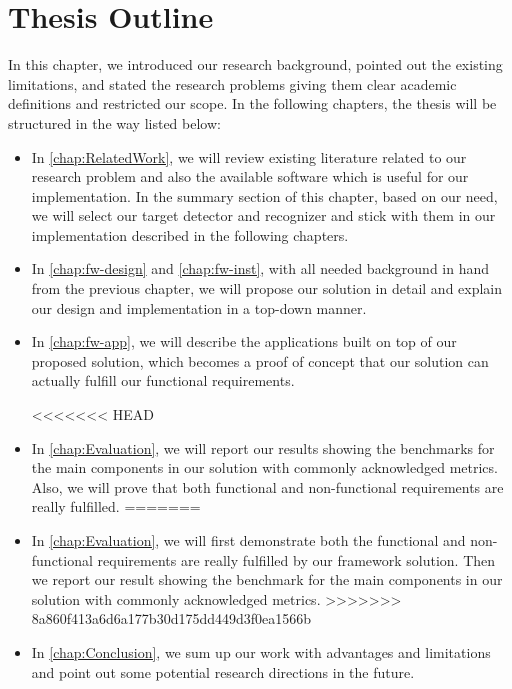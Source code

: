 
\section{Thesis Outline}
\label{sec:intro-outline}

In this chapter, we introduced our research background, pointed out the
existing limitations, and stated the research problems giving them clear academic
definitions and restricted our scope.
In the following chapters, the thesis will be structured in the way listed
below:

\begin{itemize}
    \item In \autoref{chap:RelatedWork}, we will review existing literature
    related to our research problem and also the available software which is
    useful for our implementation. In the summary section of this chapter,
    based on our need, we will select our target detector and recognizer and
    stick with them in our implementation described in the following chapters.

    \item In \autoref{chap:fw-design} and \autoref{chap:fw-inst}, with all
    needed background in hand from the previous chapter, we will propose our
    solution in detail and explain our design and implementation in a top-down
    manner.

    \item In \autoref{chap:fw-app}, we will describe the applications built on
    top of our proposed solution, which becomes a proof of concept that our
    solution can actually fulfill our functional requirements.

<<<<<<< HEAD
    \item In \autoref{chap:Evaluation}, we will report our results showing the
	benchmarks for the main components in our solution with commonly acknowledged 
	metrics. Also, we will prove that both functional and non-functional
    requirements are really fulfilled.
=======
    \item In \autoref{chap:Evaluation}, we will first demonstrate both the
    functional and non-functional requirements are really fulfilled by our
    framework solution. Then we report our result showing the benchmark for the
    main components in our solution with commonly acknowledged metrics.
>>>>>>> 8a860f413a6d6a177b30d175dd449d3f0ea1566b

    \item In \autoref{chap:Conclusion}, we sum up our work with advantages and
	limitations and point out some potential research directions in the future.
\end{itemize}

